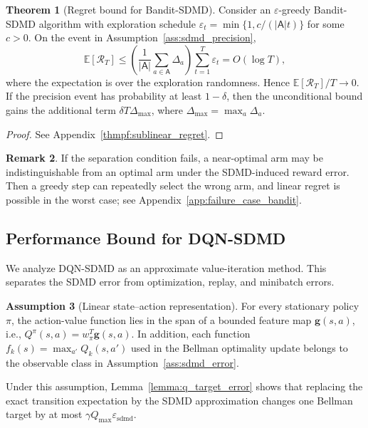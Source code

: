 \documentclass{article}
\numberwithin{equation}{section}
\theoremstyle{definition}
\newtheorem{theorem}{Theorem}[section]
\newtheorem{assumption}[theorem]{Assumption}
\newtheorem{remark}[theorem]{Remark}
\begin{document}
\begin{theorem}[Regret bound for Bandit-SDMD]\label{thm:sublinear_regret}
Consider an $\varepsilon$-greedy Bandit-SDMD algorithm with exploration schedule $\varepsilon_t=\min\{1,c/(|\mathsf{A}|t)\}$ for some $c>0$. On the event in Assumption~\ref{ass:sdmd_precision},
\begin{equation*}
\mathbb{E}[\mathcal{R}_T]
\le
\left(\frac{1}{|\mathsf{A}|}\sum_{a\in\mathsf{A}}\Delta_a\right)
\sum_{t=1}^T\varepsilon_t
=O(\log T),
\end{equation*}
where the expectation is over the exploration randomness. Hence $\mathbb{E}[\mathcal{R}_T]/T\to0$. If the precision event has probability at least $1-\delta$, then the unconditional bound gains the additional term $\delta T\Delta_{\max}$, where $\Delta_{\max}=\max_a\Delta_a$.
\end{theorem}
\begin{proof} See Appendix~\ref{thmpf:sublinear_regret}. \end{proof}

\begin{remark}
If the separation condition fails, a near-optimal arm may be indistinguishable from an optimal arm under the SDMD-induced reward error. Then a greedy step can repeatedly select the wrong arm, and linear regret is possible in the worst case; see Appendix~\ref{app:failure_case_bandit}.
\end{remark}

\subsection{Performance Bound for DQN-SDMD}
We analyze DQN-SDMD as an approximate value-iteration method. This separates the SDMD error from optimization, replay, and minibatch errors.

\begin{assumption}[Linear state--action representation]\label{ass:linear_q}
For every stationary policy $\pi$, the action-value function lies in the span of a bounded feature map $\mathbf{g}(s,a)$, i.e., $Q^\pi(s,a)=w_\pi^T\mathbf{g}(s,a)$. In addition, each function $f_k(s)=\max_{a'}Q_k(s,a')$ used in the Bellman optimality update belongs to the observable class in Assumption~\ref{ass:sdmd_error}.
\end{assumption}

Under this assumption, Lemma~\ref{lemma:q_target_error} shows that replacing the exact transition expectation by the SDMD approximation changes one Bellman target by at most $\gamma Q_{\max}\varepsilon_{\mathrm{sdmd}}$.
\end{document}
